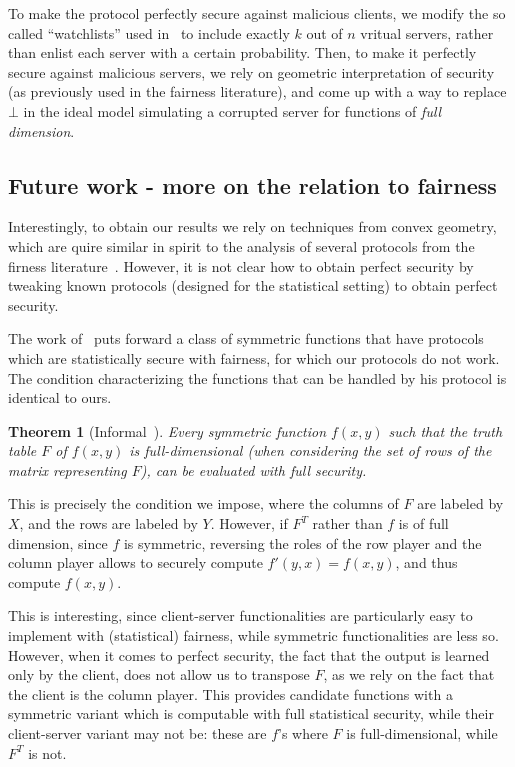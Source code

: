 \documentclass[a4paper]{article}
\newtheorem{theorem}{Theorem}[section]
\begin{document}
To make the protocol perfectly secure against malicious clients, we modify the so called ``watchlists'' used in~\cite{IKOPS11}  to include exactly $k$ out of $n$ vritual servers, rather than enlist each server with a certain probability. Then, to make it perfectly secure against malicious servers, we rely on geometric interpretation of security (as previously used in the fairness literature), and come up with a way to replace $\bot$ in the ideal model simulating a corrupted server for functions of \emph{full dimension}.

\subsection{Future work - more on the relation to fairness}
Interestingly, to obtain our results we rely on techniques from convex geometry, which are quire similar in spirit to the analysis of several protocols from the firness literature~\cite{}. However, it is not clear how to obtain perfect security by tweaking known protocols (designed for the statistical setting) to obtain perfect security.

The work of~\cite{Ash14} puts forward a class of symmetric functions that have protocols which are statistically secure with fairness, for which our protocols do not work. The condition characterizing the functions that can be handled by his protocol is identical to ours. 

\begin{theorem}[Informal~\cite{Ash14}]
Every symmetric function $f(x,y)$ such that 	
the truth table $F$ of $f(x,y)$ is \emph{full-dimensional} (when considering the set of rows of the matrix representing $F$), can be evaluated with full security. 
\end{theorem}

This is precisely the condition we impose, where the columns of $F$ are labeled by $X$, and the rows are labeled by $Y$. However, if $F^T$
rather than $f$ is of full dimension, since $f$ is symmetric, reversing the roles of the row player and the column player allows to securely compute $f'(y,x)=f(x,y)$, and thus compute $f(x,y)$. 

This is interesting, since client-server functionalities are particularly easy to implement with (statistical) fairness, while symmetric functionalities are less so. However, when it comes to perfect security, the fact that the output is learned only by the client, does not allow us to transpose $F$, as we rely on the fact that the client is the column player. This provides candidate functions with a symmetric variant which is computable with full statistical security, while their client-server variant 
may not be: these are $f$'s where $F$ is full-dimensional, while $F^T$ is not.
\end{document}
